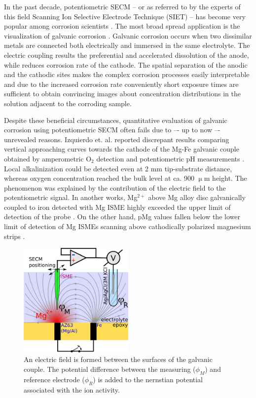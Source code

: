 \documentclass[3p]{elsarticle}
\begin{document}
In the past decade, potentiometric SECM -- or as referred to by the experts of this field Scanning Ion Selective Electrode Technique (SIET) -- has become very popular among corrosion scientists \cite{lamaka, ZnISME, diamondel, cutedge, H+selective, simulating}.
The most broad spread application is the visualization of galvanic corrosion \cite{amperopot, chloride, spatiozn, fezn}.
Galvanic corrosion occurs when two dissimilar metals are connected both electrically and immersed in the same electrolyte. 
The electric coupling results the preferential and accelerated dissolution of the anode, while reduces corrosion rate of the cathode.
The spatial separation of the anodic and the cathodic sites makes the complex corrosion processes easily interpretable and due to the increased corrosion rate conveniently short exposure times are sufficient to obtain convincing images about concentration distributions in the solution adjacent to the corroding sample.

Despite these beneficial circumstances, quantitative evaluation of galvanic corrosion using potentiometric SECM often fails due to –- up to now –- unrevealed reasons.
Izquierdo et. al. reported discrepant results comparing vertical approaching curves towards the cathode of the Mg-Fe galvanic couple obtained by amperometric O$_2$ detection and potentiometric pH measurements \cite{pH15}. Local alkalinization could be detected even at 2 mm tip-substrate distance, whereas oxygen concentration reached the bulk level at ca. 900 $\upmu$m height. The phenomenon was explained by the contribution of the electric field to the potentiometric signal.  
In another works, Mg$^{2+}$ above Mg alloy disc galvanically coupled to iron detected with Mg ISME highly exceeded the upper limit of detection of the probe \cite{overmg1, overmg2, overmg3}.
On the other hand, pMg values fallen below the lower limit of detection of Mg ISMEs scanning above cathodically polarized magnesium strips \cite{belowmg}. 

\begin{figure}
\centering
\includegraphics[width=0.5\textwidth]{abstract.eps}
\caption{An electric field is formed between the surfaces of the galvanic couple. The potential difference between the measuring ($\phi_M$) and reference electrode ($\phi_R$) is added to the nernstian potential associated with the ion activity.}
\label{fig:abstract}
\end{figure}
\end{document}
